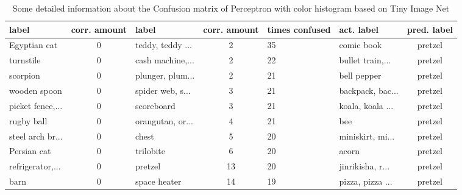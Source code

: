 \documentclass[11pt]{article}
\begin{document}
\begin{table}[h]
\begin{tabular}{lc|lc|llc}
\toprule
             label &  corr. amount &                    label &  corr. amount &  times confused & act. label &   pred. label \\
\midrule
     Egyptian cat &                        0 &  teddy, teddy ... &                        2 &              35 &        comic book &         pretzel \\
        turnstile &                        0 &  cash machine,... &                        2 &              22 &  bullet train,... &         pretzel \\
         scorpion &                        0 &  plunger, plum... &                        2 &              21 &       bell pepper &         pretzel \\
     wooden spoon &                        0 &  spider web, s... &                        3 &              21 &  backpack, bac... &         pretzel \\
 picket fence,... &                        0 &        scoreboard &                        3 &              21 &  koala, koala ... &         pretzel \\
       rugby ball &                        0 &  orangutan, or... &                        4 &              21 &               bee &         pretzel \\
 steel arch br... &                        0 &             chest &                        5 &              20 &  miniskirt, mi... &         pretzel \\
      Persian cat &                        0 &         trilobite &                        6 &              20 &             acorn &         pretzel \\
 refrigerator,... &                        0 &           pretzel &                       13 &              20 &  jinrikisha, r... &         pretzel \\
             barn &                        0 &      space heater &                       14 &              19 &  pizza, pizza ... &         pretzel \\
\bottomrule
\end{tabular}
\caption{Some detailed information about the Confusion matrix of Perceptron with color histogram based on Tiny Image Net }
\label{tablePpnTIN}
\end{table} 
\end{document}
